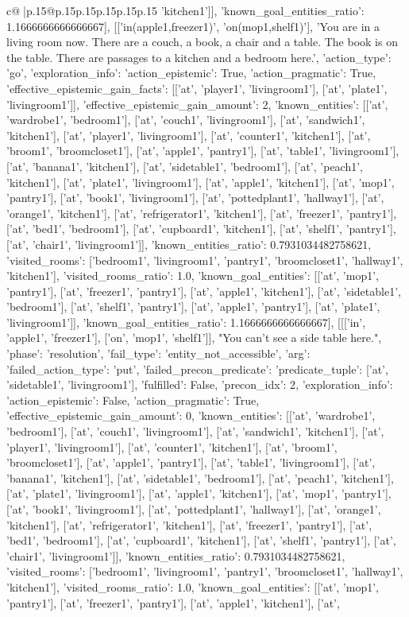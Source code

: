 \documentclass{article}
\begin{document}
{\begin{supertabular}{c@{$\;$}|p{.15\linewidth}@{}p{.15\linewidth}p{.15\linewidth}p{.15\linewidth}p{.15\linewidth}p{.15\linewidth}}
{{{'kitchen1']], 'known_goal_entities_ratio': 1.1666666666666667}}], [['in(apple1,freezer1)', 'on(mop1,shelf1)'], 'You are in a living room now. There are a couch, a book, a chair and a table. The book is on the table. There are passages to a kitchen and a bedroom here.', {'action_type': 'go', 'exploration_info': {'action_epistemic': True, 'action_pragmatic': True, 'effective_epistemic_gain_facts': [['at', 'player1', 'livingroom1'], ['at', 'plate1', 'livingroom1']], 'effective_epistemic_gain_amount': 2, 'known_entities': [['at', 'wardrobe1', 'bedroom1'], ['at', 'couch1', 'livingroom1'], ['at', 'sandwich1', 'kitchen1'], ['at', 'player1', 'livingroom1'], ['at', 'counter1', 'kitchen1'], ['at', 'broom1', 'broomcloset1'], ['at', 'apple1', 'pantry1'], ['at', 'table1', 'livingroom1'], ['at', 'banana1', 'kitchen1'], ['at', 'sidetable1', 'bedroom1'], ['at', 'peach1', 'kitchen1'], ['at', 'plate1', 'livingroom1'], ['at', 'apple1', 'kitchen1'], ['at', 'mop1', 'pantry1'], ['at', 'book1', 'livingroom1'], ['at', 'pottedplant1', 'hallway1'], ['at', 'orange1', 'kitchen1'], ['at', 'refrigerator1', 'kitchen1'], ['at', 'freezer1', 'pantry1'], ['at', 'bed1', 'bedroom1'], ['at', 'cupboard1', 'kitchen1'], ['at', 'shelf1', 'pantry1'], ['at', 'chair1', 'livingroom1']], 'known_entities_ratio': 0.7931034482758621, 'visited_rooms': ['bedroom1', 'livingroom1', 'pantry1', 'broomcloset1', 'hallway1', 'kitchen1'], 'visited_rooms_ratio': 1.0, 'known_goal_entities': [['at', 'mop1', 'pantry1'], ['at', 'freezer1', 'pantry1'], ['at', 'apple1', 'kitchen1'], ['at', 'sidetable1', 'bedroom1'], ['at', 'shelf1', 'pantry1'], ['at', 'apple1', 'pantry1'], ['at', 'plate1', 'livingroom1']], 'known_goal_entities_ratio': 1.1666666666666667}}], [[['in', 'apple1', 'freezer1'], ['on', 'mop1', 'shelf1']], "You can't see a side table here.", {'phase': 'resolution', 'fail_type': 'entity_not_accessible', 'arg': {'failed_action_type': 'put', 'failed_precon_predicate': {'predicate_tuple': ['at', 'sidetable1', 'livingroom1'], 'fulfilled': False, 'precon_idx': 2}}, 'exploration_info': {'action_epistemic': False, 'action_pragmatic': True, 'effective_epistemic_gain_amount': 0, 'known_entities': [['at', 'wardrobe1', 'bedroom1'], ['at', 'couch1', 'livingroom1'], ['at', 'sandwich1', 'kitchen1'], ['at', 'player1', 'livingroom1'], ['at', 'counter1', 'kitchen1'], ['at', 'broom1', 'broomcloset1'], ['at', 'apple1', 'pantry1'], ['at', 'table1', 'livingroom1'], ['at', 'banana1', 'kitchen1'], ['at', 'sidetable1', 'bedroom1'], ['at', 'peach1', 'kitchen1'], ['at', 'plate1', 'livingroom1'], ['at', 'apple1', 'kitchen1'], ['at', 'mop1', 'pantry1'], ['at', 'book1', 'livingroom1'], ['at', 'pottedplant1', 'hallway1'], ['at', 'orange1', 'kitchen1'], ['at', 'refrigerator1', 'kitchen1'], ['at', 'freezer1', 'pantry1'], ['at', 'bed1', 'bedroom1'], ['at', 'cupboard1', 'kitchen1'], ['at', 'shelf1', 'pantry1'], ['at', 'chair1', 'livingroom1']], 'known_entities_ratio': 0.7931034482758621, 'visited_rooms': ['bedroom1', 'livingroom1', 'pantry1', 'broomcloset1', 'hallway1', 'kitchen1'], 'visited_rooms_ratio': 1.0, 'known_goal_entities': [['at', 'mop1', 'pantry1'], ['at', 'freezer1', 'pantry1'], ['at', 'apple1', 'kitchen1'], ['at', }}}
\end{supertabular}}
\end{document}
